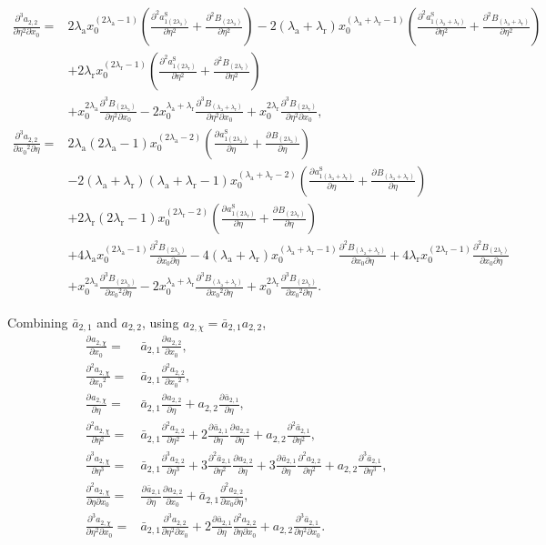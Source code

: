 \documentclass[english]{../thermomemo/thermomemo}
\newcommand*{\pd}[3][]{\frac{\partial^{#1}#2}{\partial{#3}^{#1}}}%
\newcommand*{\pdc}[3]{\frac{\partial^{2}#1}{\partial{#2}\partial{#3}}}%
\newcommand*{\pdcc}[3]{\frac{\partial^{3}#1}{\partial{#2}^{2}\partial{#3}}}%
\newcommand*{\lb}{\left(}
\newcommand*{\rb}{\right)}
\newcommand{\lama}{\ensuremath{{\lambda_{\text{a}}}}\xspace}
\newcommand{\lamr}{\ensuremath{{\lambda_{\text{r}}}}\xspace}
\newcommand{\ab}{\ensuremath{\bar{a}}\xspace}
\newcommand*{\aSl}[1]{\ensuremath{a_{1{#1}}^{\text{S}}}\xspace}
\begin{document}
\begin{align}
  \label{eq:a_22_diff_2}
    \pdcc{a_{2,2}}{\eta}{x_0} =& 2\lama x_0^{\lb 2\lama - 1\rb}\lb \pd[2]{\aSl{\lb 2\lama\rb}}{\eta} + \pd[2]{B_{\lb 2\lama\rb}}{\eta}\rb
       -2\lb\lama + \lamr\rb x_0^{\lb\lama + \lamr - 1\rb}\lb \pd[2]{\aSl{\lb\lama + \lamr\rb}}{\eta}  + \pd[2]{B_{\lb\lama + \lamr\rb}}{\eta}\rb \nonumber \\&
   + 2\lamr  x_0^{\lb 2\lamr -1 \rb}\lb \pd[2]{\aSl{\lb 2\lamr\rb}}{\eta} + \pd[2]{B_{\lb 2\lamr\rb}}{\eta}\rb \nonumber \\ &+ x_0^{2\lama} \pdcc{B_{\lb 2\lama\rb}}{\eta}{x_0}  -2x_0^{\lama + \lamr}\pdcc{B_{\lb\lama + \lamr\rb}}{\eta}{x_0}
                                                                                                                              + x_0^{2\lamr}\pdcc{B_{\lb 2\lamr\rb}}{\eta}{x_0},\\
  \pdcc{a_{2,2}}{x_0}{\eta} =& 2\lama \lb 2\lama - 1\rb x_0^{\lb 2\lama - 2\rb}\lb \pd{\aSl{\lb 2\lama\rb}}{\eta} + \pd{B_{\lb 2\lama\rb}}{\eta}\rb
       \nonumber \\& -2\lb\lama + \lamr\rb \lb\lama + \lamr - 1\rb x_0^{\lb\lama + \lamr - 2\rb}\lb \pd{\aSl{\lb\lama + \lamr\rb}}{\eta}  + \pd{B_{\lb\lama + \lamr\rb}}{\eta}\rb \nonumber \\&
   + 2\lamr \lb 2\lamr -1 \rb  x_0^{\lb 2\lamr -2 \rb}\lb \pd{\aSl{\lb 2\lamr\rb}}{\eta} + \pd{B_{\lb 2\lamr\rb}}{\eta}\rb \nonumber \\ &+ 4\lama x_0^{\lb 2\lama-1\rb} \pdc{B_{\lb 2\lama\rb}}{x_0}{\eta}  -4\lb \lama + \lamr \rb x_0^{\lb \lama + \lamr -1 \rb}\pdc{B_{\lb\lama + \lamr\rb}}{x_0}{\eta}
   + 4\lamr x_0^{\lb 2\lamr -1 \rb}\pdc{B_{\lb 2\lamr\rb}}{x_0}{\eta} \nonumber \\ &+ x_0^{2\lama} \pdcc{B_{\lb 2\lama\rb}}{x_0}{\eta}  -2x_0^{\lama + \lamr}\pdcc{B_{\lb\lama + \lamr\rb}}{x_0}{\eta}
   + x_0^{2\lamr}\pdcc{B_{\lb 2\lamr\rb}}{x_0}{\eta}.
\end{align}


Combining $\ab_{2,1}$ and $a_{2,2}$, using $a_{2,\chi} = \ab_{2,1}a_{2,2}$,
\begin{align}
  \label{eq:ab_21_a_22_diff}
  \pd{a_{2,\chi}}{x_0} =& \ab_{2,1}\pd{a_{2,2}}{x_0}, \\
  \pd[2]{a_{2,\chi}}{x_0} =& \ab_{2,1}\pd[2]{a_{2,2}}{x_0}, \\
  \pd{a_{2,\chi}}{\eta} =& \ab_{2,1}\pd{a_{2,2}}{\eta} + a_{2,2}\pd{\ab_{2,1}}{\eta}, \\
  \pd[2]{a_{2,\chi}}{\eta} =& \ab_{2,1}\pd[2]{a_{2,2}}{\eta} + 2\pd{\ab_{2,1}}{\eta}\pd{a_{2,2}}{\eta} + a_{2,2}\pd[2]{\ab_{2,1}}{\eta}, \\
  \pd[3]{a_{2,\chi}}{\eta} =& \ab_{2,1}\pd[3]{a_{2,2}}{\eta} + 3\pd[2]{\ab_{2,1}}{\eta}\pd{a_{2,2}}{\eta} + 3\pd{\ab_{2,1}}{\eta}\pd[2]{a_{2,2}}{\eta} + a_{2,2}\pd[3]{\ab_{2,1}}{\eta}, \\
  \pdc{a_{2,\chi}}{\eta}{x_0} =& \pd{\ab_{2,1}}{\eta}\pd{a_{2,2}}{x_0} + \ab_{2,1}\pdc{a_{2,2}}{x_0}{\eta}, \\
  \pdcc{a_{2,\chi}}{\eta}{x_0} =& \ab_{2,1}\pdcc{a_{2,2}}{\eta}{x_0} + 2\pd{\ab_{2,1}}{\eta}\pdc{a_{2,2}}{\eta}{x_0} + a_{2,2}\pdcc{\ab_{2,1}}{\eta}{x_0}. \\
\end{align}
\end{document}
